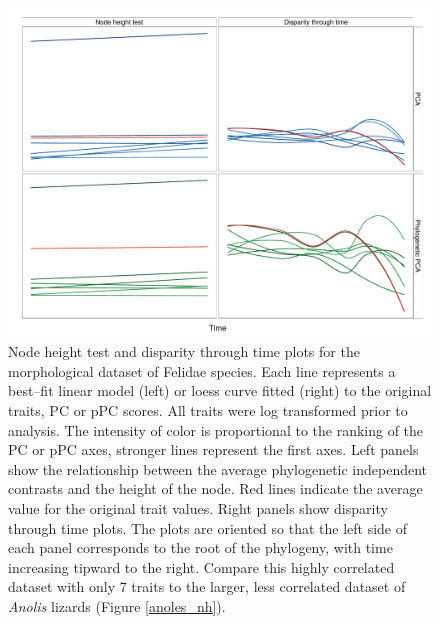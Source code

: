 \documentclass[12pt,twoside]{article}
\begin{document}
\begin{figure}[p]
\centering
\includegraphics[scale=0.65]{fig/felidae_nh-dtt.pdf}
\caption[Node height test and disparity through time on the Felidae dataset]{Node height test and disparity through time plots for the morphological dataset of Felidae species. Each line represents a best--fit linear model (left) or loess curve fitted (right) to the original traits, PC or pPC scores. All traits were log transformed prior to analysis. The intensity of color is proportional to the ranking of the PC or pPC axes, stronger lines represent the first axes. Left panels show the relationship between the average phylogenetic independent contrasts and the height of the node. Red lines indicate the average value for the original trait values. Right panels show disparity through time plots. The plots are oriented so that the left side of each panel corresponds to the root of the phylogeny, with time increasing tipward to the right. Compare this highly correlated dataset with only 7 traits to the larger, less correlated dataset of \textit{Anolis} lizards (Figure \ref{anoles_nh}).}
\label{felidae.nh}
\end{figure}
\end{document}
